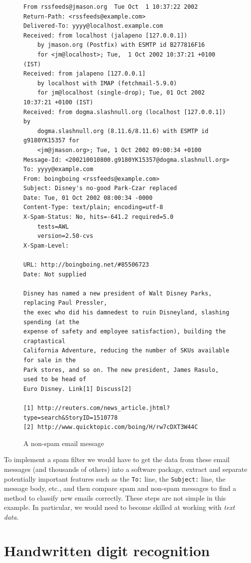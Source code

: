 \documentclass[12pt,oneside]{book}\usepackage[]{graphicx}\usepackage[]{color}
\begin{document}
\begin{figure}[H]
\begin{Verbatim}[fontsize = \small]
From rssfeeds@jmason.org  Tue Oct  1 10:37:22 2002
Return-Path: <rssfeeds@example.com>
Delivered-To: yyyy@localhost.example.com
Received: from localhost (jalapeno [127.0.0.1])
	by jmason.org (Postfix) with ESMTP id B277816F16
	for <jm@localhost>; Tue,  1 Oct 2002 10:37:21 +0100 (IST)
Received: from jalapeno [127.0.0.1]
	by localhost with IMAP (fetchmail-5.9.0)
	for jm@localhost (single-drop); Tue, 01 Oct 2002 10:37:21 +0100 (IST)
Received: from dogma.slashnull.org (localhost [127.0.0.1]) by
    dogma.slashnull.org (8.11.6/8.11.6) with ESMTP id g9180YK15357 for
    <jm@jmason.org>; Tue, 1 Oct 2002 09:00:34 +0100
Message-Id: <200210010800.g9180YK15357@dogma.slashnull.org>
To: yyyy@example.com
From: boingboing <rssfeeds@example.com>
Subject: Disney's no-good Park-Czar replaced
Date: Tue, 01 Oct 2002 08:00:34 -0000
Content-Type: text/plain; encoding=utf-8
X-Spam-Status: No, hits=-641.2 required=5.0
	tests=AWL
	version=2.50-cvs
X-Spam-Level: 

URL: http://boingboing.net/#85506723
Date: Not supplied

Disney has named a new president of Walt Disney Parks, replacing Paul Pressler, 
the exec who did his damnedest to ruin Disneyland, slashing spending (at the 
expense of safety and employee satisfaction), building the craptastical 
California Adventure, reducing the number of SKUs available for sale in the 
Park stores, and so on. The new president, James Rasulo, used to be head of 
Euro Disney. Link[1] Discuss[2]

[1] http://reuters.com/news_article.jhtml?type=search&StoryID=1510778
[2] http://www.quicktopic.com/boing/H/rw7cDXT3W44C
\end{Verbatim}
\caption{A non-spam email message}
\label{FIG:HAM}
\end{figure}
To implement a spam filter we would have to get the data from these email messages (and thousands of others) into a software package, extract and separate potentially important features such as the \verb+To:+ line, the \verb+Subject:+ line, the message body, etc., and then compare spam and non-spam messages to find a method to classify new emails correctly. These steps are not simple in this example. In particular, we would need to become skilled at working with \emph{text data}.

\section{Handwritten digit recognition}
\end{document}
